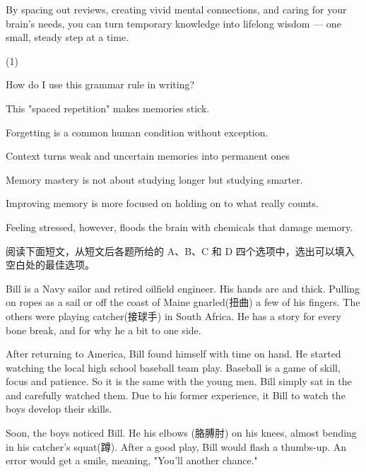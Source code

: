 \documentclass{英语试卷}
\begin{document}
\par {} By spacing out reviews, creating vivid mental connections, and caring for your brain's needs, you can turn temporary knowledge into lifelong wisdom — one small, steady step at a time.\par
\begin{choices}(1)
  \item How do I use this grammar rule in writing?
  \item This "spaced repetition" makes memories stick.
  \item Forgetting is a common human condition without exception.
  \item Context turns weak and uncertain memories into permanent ones
  \item Memory mastery is not about studying longer but studying smarter.
  \item Improving memory is more focused on holding on to what really counts.
  \item Feeling stressed, however, floods the brain with chemicals that damage memory.
\end{choices}
\par 阅读下面短文，从短文后各题所给的 A、B、C 和 D 四个选项中，选出可以填入空白处的最佳选项。\par
\par Bill is a Navy sailor and retired oilfield engineer. His hands are  and thick. Pulling on ropes as a sail or off the coast of Maine gnarled(扭曲) a few of his fingers. The others were  playing catcher(接球手) in South Africa. He has a story for every bone break, and for why he  a bit to one side.\par
\par After returning to America, Bill found himself with  time on hand. He started watching the local high school baseball team play. Baseball is a game of skill, focus and patience. So it is the same with  the young men. Bill simply sat in the  and carefully watched them. Due to his former experience, it  Bill to watch the boys develop their skills.\par
\par Soon, the boys noticed Bill. He  his elbows (胳膊肘) on his knees, almost bending in his  catcher's squat(蹲). After a good play, Bill would flash a thumbs-up. An error would get a smile, meaning, "You'll  another chance."\par
\end{document}
